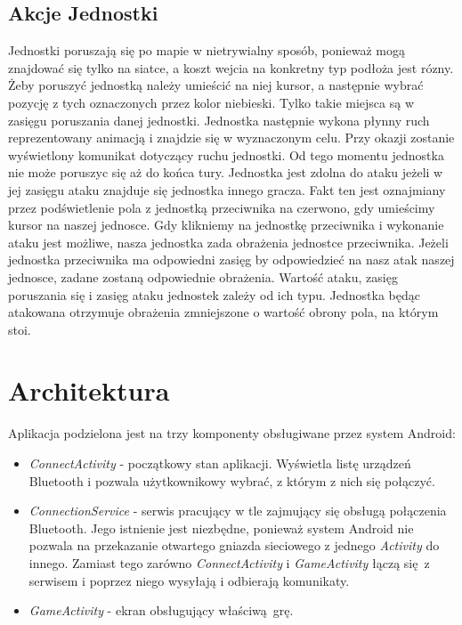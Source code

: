 \documentclass[paper=a4, fontsize=11pt]{scrartcl} %
\numberwithin{equation}{section} %
\numberwithin{figure}{section} %
\numberwithin{table}{section} %
\begin{document}
\subsection{Akcje Jednostki}
Jednostki poruszają się po mapie w nietrywialny sposób, ponieważ mogą znajdować się tylko na siatce, a koszt wejcia na konkretny typ podłoża jest rózny. Żeby poruszyć jednostką należy umieścić na niej kursor, a następnie wybrać pozycję z tych oznaczonych przez kolor niebieski. Tylko takie miejsca są w zasięgu poruszania danej jednostki. Jednostka następnie wykona płynny ruch reprezentowany animacją i znajdzie się w wyznaczonym celu. Przy okazji zostanie wyświetlony komunikat dotyczący ruchu jednostki. Od tego momentu jednostka nie może poruszyc się aż do końca tury. Jednostka jest zdolna do ataku jeżeli w jej zasięgu ataku znajduje się jednostka innego gracza. Fakt ten jest oznajmiany przez podświetlenie pola z jednostką przeciwnika na czerwono, gdy umieścimy kursor na naszej jednosce. Gdy klikniemy na jednostkę przeciwnika i wykonanie ataku jest możliwe, nasza jednostka zada obrażenia jednostce przeciwnika. Jeżeli jednostka przeciwnika ma odpowiedni zasięg by odpowiedzieć na nasz atak naszej jednosce, zadane zostaną odpowiednie obrażenia. Wartość ataku, zasięg poruszania się i zasięg ataku jednostek zależy od ich typu. Jednostka będąc atakowana otrzymuje obrażenia zmniejszone o wartość obrony pola, na którym stoi.

\section{Architektura}
Aplikacja podzielona jest na trzy komponenty obsługiwane przez system Android:

\begin{itemize}

  \item \emph{ConnectActivity} - początkowy stan aplikacji. Wyświetla listę
    urządzeń Bluetooth i pozwala użytkownikowy wybrać, z którym z nich się
    połączyć.

  \item \emph{ConnectionService} - serwis pracujący w tle zajmujący się obsługą
    połączenia Bluetooth. Jego istnienie jest niezbędne, ponieważ system
    Android nie pozwala na przekazanie otwartego gniazda sieciowego z jednego
    \textit{Activity} do innego. Zamiast tego zarówno \textit{ConnectActivity}
    i \textit{GameActivity} łączą się z serwisem i poprzez niego wysyłają i
    odbierają komunikaty.

  \item \emph{GameActivity} - ekran obsługujący właściwą grę.

\end{itemize}





\end{document}
